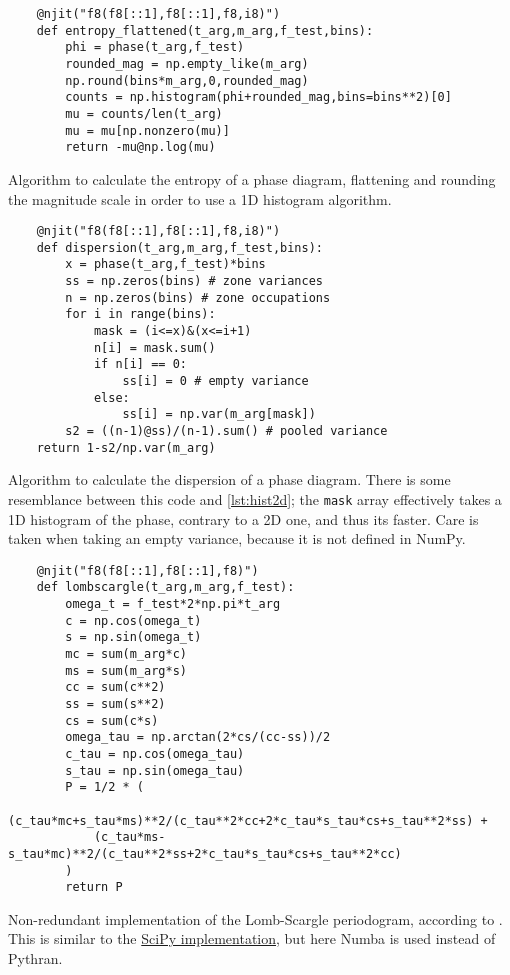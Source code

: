 \begin{listing}
	\begin{verbatim}
	@njit("f8(f8[::1],f8[::1],f8,i8)")
	def entropy_flattened(t_arg,m_arg,f_test,bins):
	    phi = phase(t_arg,f_test)
	    rounded_mag = np.empty_like(m_arg)
	    np.round(bins*m_arg,0,rounded_mag)
	    counts = np.histogram(phi+rounded_mag,bins=bins**2)[0]
	    mu = counts/len(t_arg)
	    mu = mu[np.nonzero(mu)]
	    return -mu@np.log(mu)
	\end{verbatim}
	\caption[\enquote{Flattened} entropy method implementation]{
		Algorithm to calculate the entropy of a phase diagram, 
		flattening and rounding the magnitude scale in order to use a 1D histogram algorithm.
	}
	\label{lst:entropy-flattened}
\end{listing}

\begin{listing}
	\begin{verbatim}
	@njit("f8(f8[::1],f8[::1],f8,i8)")
	def dispersion(t_arg,m_arg,f_test,bins):
	    x = phase(t_arg,f_test)*bins
	    ss = np.zeros(bins) # zone variances
	    n = np.zeros(bins) # zone occupations
	    for i in range(bins):
	        mask = (i<=x)&(x<=i+1)
	        n[i] = mask.sum()
	        if n[i] == 0:
	            ss[i] = 0 # empty variance
	        else:
	            ss[i] = np.var(m_arg[mask])
	    s2 = ((n-1)@ss)/(n-1).sum() # pooled variance
    return 1-s2/np.var(m_arg)
	\end{verbatim}
	\caption[Dispersion method implementation]{
		Algorithm to calculate the dispersion of a phase diagram.
		There is some resemblance between this code and \autoref{lst:hist2d};
		the \texttt{mask} array effectively takes a 1D histogram of the phase, 
		contrary to a 2D one, and thus its faster.
		Care is taken when taking an empty variance, because it is not defined in NumPy.
	}
	\label{lst:dispersion}
\end{listing}


\begin{listing}
	\begin{verbatim}
	@njit("f8(f8[::1],f8[::1],f8)")
	def lombscargle(t_arg,m_arg,f_test):
	    omega_t = f_test*2*np.pi*t_arg
	    c = np.cos(omega_t)
	    s = np.sin(omega_t)
	    mc = sum(m_arg*c)
	    ms = sum(m_arg*s)
	    cc = sum(c**2)
	    ss = sum(s**2)
	    cs = sum(c*s)
	    omega_tau = np.arctan(2*cs/(cc-ss))/2
	    c_tau = np.cos(omega_tau)
	    s_tau = np.sin(omega_tau)
	    P = 1/2 * (
	        (c_tau*mc+s_tau*ms)**2/(c_tau**2*cc+2*c_tau*s_tau*cs+s_tau**2*ss) + 
	        (c_tau*ms-s_tau*mc)**2/(c_tau**2*ss+2*c_tau*s_tau*cs+s_tau**2*cc)
	    )
	    return P
	\end{verbatim}
	\caption[Non-redundant implementation of the Lomb-Scargle periodogram]{
		Non-redundant implementation of the Lomb-Scargle periodogram, according to \cite{Townsend2010}.
		This is similar to the \href{https://github.com/scipy/scipy/blob/master/scipy/signal/\_spectral.py}{SciPy implementation}, 
		but here Numba is used instead of Pythran. 
	}
	\label{lst:lomb-scargle}
\end{listing}

